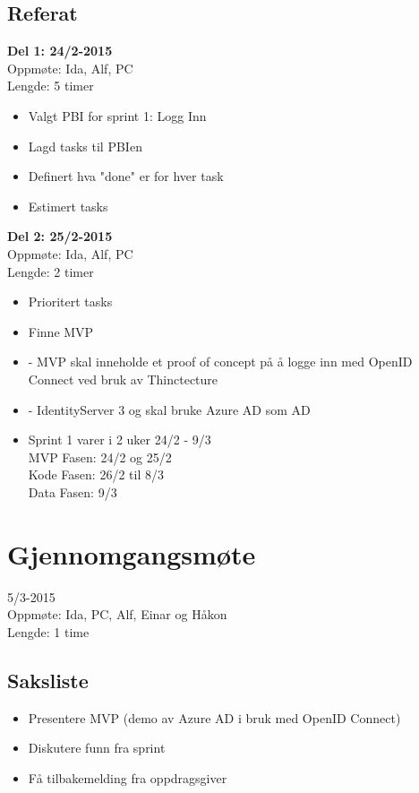 \subsection{Referat}
\textbf{Del 1: 24/2-2015}
\\Oppmøte: Ida, Alf, PC
\\Lengde: 5 timer 
\\
\begin{itemize}
\item Valgt PBI for sprint 1: Logg Inn 
\item Lagd tasks til PBIen
\item Definert hva "done" er for hver task 
\item Estimert tasks 
\end{itemize}
\bigskip
\textbf{Del 2: 25/2-2015 }
\\Oppmøte: Ida, Alf, PC
\\Lengde: 2 timer 
\\
\begin{itemize}
\item Prioritert tasks 
\item Finne MVP 
\item - MVP skal inneholde et proof of concept på å logge inn med OpenID Connect ved bruk av Thinctecture
\item - IdentityServer 3 og skal bruke Azure AD som AD 
\item Sprint 1 varer i 2 uker 24/2 - 9/3 
\\MVP Fasen: 24/2 og 25/2 
\\Kode Fasen: 26/2 til 8/3 
\\Data Fasen: 9/3 
\end{itemize}


\section{Gjennomgangsmøte }
\label{app:MotereferaterSprint1_gjennomgangsmote}
5/3-2015 
\\Oppmøte: Ida, PC, Alf, Einar og Håkon 
\\Lengde: 1 time 
 
\subsection{Saksliste}
\begin{itemize}
\item Presentere  MVP (demo av Azure AD i bruk med OpenID Connect)
\item Diskutere funn fra sprint 
\item Få tilbakemelding fra oppdragsgiver 
\end{itemize}

